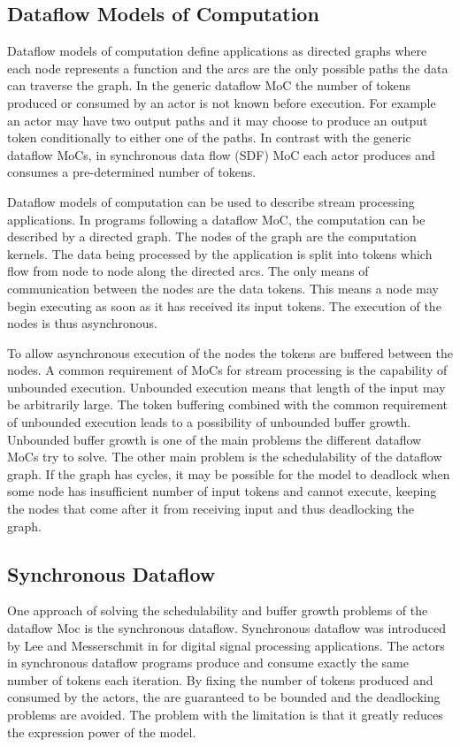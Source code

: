 \subsection{Dataflow Models of Computation}
\label{subsec:dataflow-moc}
Dataflow models of computation define applications as directed graphs where each node represents a function and the arcs are the only possible paths the data can traverse the graph. In the generic dataflow MoC the number of tokens produced or consumed by an actor is not known before execution. For example an actor may have two output paths and it may choose to produce an output token conditionally to either one of the paths. In contrast with the generic dataflow MoCs, in synchronous data flow (SDF) MoC each actor produces and consumes a pre-determined number of tokens.~\cite{lee1987synchronous}

Dataflow models of computation can be used to describe stream processing applications. In programs following a dataflow MoC, the computation can be described by a directed graph. The nodes of the graph are the computation kernels. The data being processed by the application is split into tokens which flow from node to node along the directed arcs. The only means of communication between the nodes are the data tokens. This means a node may begin executing as soon as it has received its input tokens. The execution of the nodes is thus asynchronous.~\cite{lee2015introduction}

To allow asynchronous execution of the nodes the tokens are buffered between the nodes. A common requirement of MoCs for stream processing is the capability of unbounded execution. Unbounded execution means that length of the input may be arbitrarily large. The token buffering combined with the common requirement of unbounded execution leads to a possibility of unbounded buffer growth. Unbounded buffer growth is one of the main problems the different dataflow MoCs try to solve. The other main problem is the schedulability of the dataflow graph. If the graph has cycles, it may be possible for the model to deadlock when some node has insufficient number of input tokens and cannot execute, keeping the nodes that come after it from receiving input and thus deadlocking the graph.~\cite{lee2015introduction}

\subsection{Synchronous Dataflow}
\label{subsec:synchronous-dataflow}
One approach of solving the schedulability and buffer growth problems of the dataflow Moc is the synchronous dataflow. Synchronous dataflow was introduced by Lee and Messerschmit in \cite{lee1987synchronous} for digital signal processing applications. The actors in synchronous dataflow programs produce and consume exactly the same number of tokens each iteration. By fixing the number of tokens produced and consumed by the actors, the are guaranteed to be bounded and the deadlocking problems are avoided. The problem with the limitation is that it greatly reduces the expression power of the model.~\cite{lee2015introduction}

